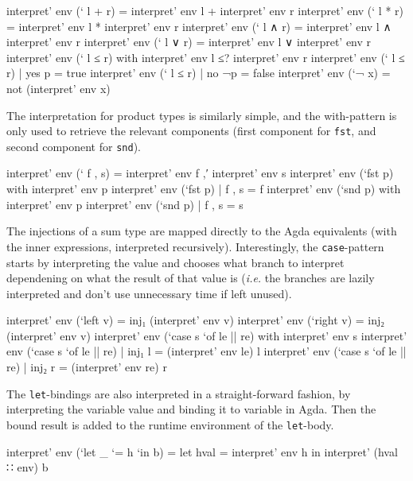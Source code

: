 \documentclass{article}
\begin{document}
\begin{code}
           interpret' env (` l + r) =
              interpret' env l + interpret' env r
           interpret' env (` l * r) = 
              interpret' env l * interpret' env r
           interpret' env (` l ∧ r) = 
              interpret' env l ∧ interpret' env r
           interpret' env (` l ∨ r) = 
              interpret' env l ∨ interpret' env r
           interpret' env (` l ≤ r) with interpret' env l ≤? interpret' env r 
           interpret' env (` l ≤ r) | yes p = true
           interpret' env (` l ≤ r) | no ¬p = false
           interpret' env (`¬ x) = not (interpret' env x) 
\end{code}

The interpretation for product types is similarly simple, and the with-pattern is only used to retrieve the relevant components (first component for \texttt{fst}, and second component for \texttt{snd}).
\begin{code}
           interpret' env (` f , s) = interpret' env f ,′ interpret' env s
           interpret' env (`fst p) with interpret' env p
           interpret' env (`fst p) | f , s = f
           interpret' env (`snd p) with interpret' env p
           interpret' env (`snd p) | f , s = s
\end{code}

The injections of a sum type are mapped directly to the Agda equivalents (with the inner expressions, interpreted recursively).
Interestingly, the \texttt{case}-pattern starts by interpreting the value and chooses
what branch to interpret dependening on what the result of that value is (\textit{i.e.} the branches are lazily interpreted and don't use unnecessary time if left unused).

\begin{code}
           interpret' env (`left v) = inj₁ (interpret' env v)
           interpret' env (`right v) = inj₂ (interpret' env v)
           interpret' env (`case s `of le || re) with interpret' env s
           interpret' env (`case s `of le || re) | inj₁ l = (interpret' env le) l
           interpret' env (`case s `of le || re) | inj₂ r = (interpret' env re) r
\end{code}

The \texttt{let}-bindings are also interpreted in a straight-forward fashion, by interpreting the variable value and binding it to variable in Agda. Then the bound result
is added to the runtime environment of the \texttt{let}-body.

\begin{code}
           interpret' env (`let _ `= h `in b) = let hval = interpret' env h 
                                                in interpret' (hval ∷ env) b
\end{code}
\end{document}
